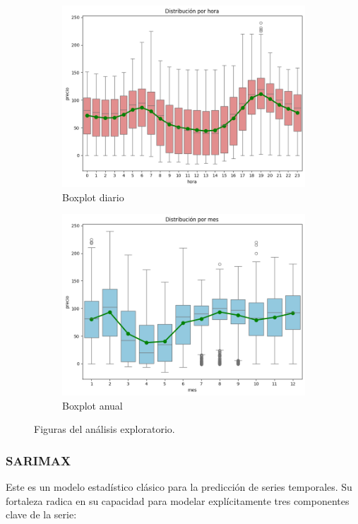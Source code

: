 \begin{figure}[H]
\begin{subfigure}[b]{0.4\textwidth}
\includegraphics[width=\textwidth]{figuras/boxplot_diario.png}
\caption[Boxplot diario]{Boxplot diario}
\label{Booxplotdiario}
\end{subfigure}
\begin{subfigure}[b]{0.4\textwidth}
\centering
\includegraphics[width=\textwidth]{figuras/boxplot_anual.png}
\caption[Boxplot anual]{Boxplot anual}
\label{Boxplotanual}
\end{subfigure}
\caption{Figuras del análisis exploratorio.}
\label{Análisis exploratorio}
\end{figure}
%
%
%
\subsubsection{SARIMAX}
%
%
%
Este es un modelo estadístico clásico para la predicción de series temporales. Su fortaleza radica en su capacidad para modelar explícitamente tres componentes clave de la serie:


